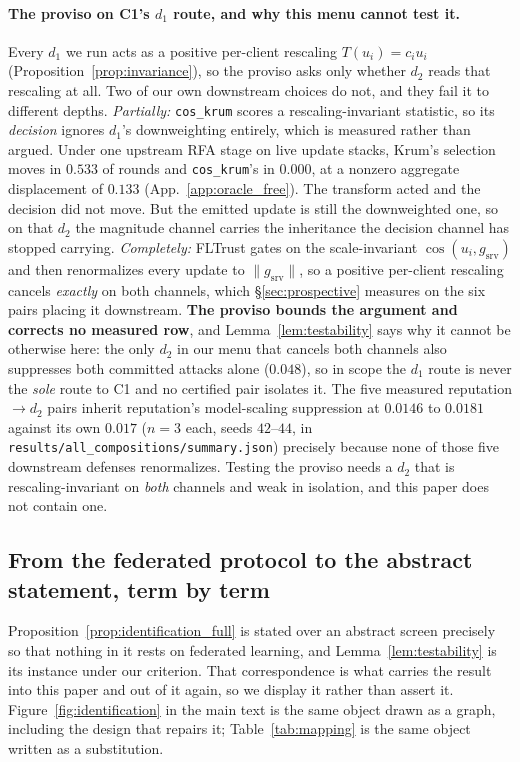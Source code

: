 \documentclass{article}
\begin{document}
\paragraph{The proviso on C1's $d_1$ route, and why this menu cannot test it.} Every $d_1$ we run acts as a positive per-client rescaling $T(u_i) = c_i u_i$ (Proposition~\ref{prop:invariance}), so the proviso asks only whether $d_2$ reads that rescaling at all. Two of our own downstream choices do not, and they fail it to different depths. \emph{Partially:} \texttt{cos\_krum} scores a rescaling-invariant statistic, so its \emph{decision} ignores $d_1$'s downweighting entirely, which is measured rather than argued. Under one upstream RFA stage on live update stacks, Krum's selection moves in $0.533$ of rounds and \texttt{cos\_krum}'s in $\mathbf{0.000}$, at a nonzero aggregate displacement of $0.133$ (App.~\ref{app:oracle_free}). The transform acted and the decision did not move. But the emitted update is still the downweighted one, so on that $d_2$ the magnitude channel carries the inheritance the decision channel has stopped carrying. \emph{Completely:} FLTrust gates on the scale-invariant $\cos(u_i, g_{\mathrm{srv}})$ and then renormalizes every update to $\|g_{\mathrm{srv}}\|$, so a positive per-client rescaling cancels \emph{exactly} on both channels, which §\ref{sec:prospective} measures on the six pairs placing it downstream. \textbf{The proviso bounds the argument and corrects no measured row}, and Lemma~\ref{lem:testability} says why it cannot be otherwise here: the only $d_2$ in our menu that cancels both channels also suppresses both committed attacks alone ($0.048$), so in scope the $d_1$ route is never the \emph{sole} route to C1 and no certified pair isolates it. The five measured reputation$\to d_2$ pairs inherit reputation's model-scaling suppression at $0.0146$ to $0.0181$ against its own $0.017$ ($n{=}3$ each, seeds $42$--$44$, in \texttt{results/\allowbreak all\_\allowbreak compositions/\allowbreak summary.json}) precisely because none of those five downstream defenses renormalizes. Testing the proviso needs a $d_2$ that is rescaling-invariant on \emph{both} channels and weak in isolation, and this paper does not contain one.

\subsection{From the federated protocol to the abstract statement, term by term}
\label{app:mapping}

Proposition~\ref{prop:identification_full} is stated over an abstract screen precisely so that nothing in it rests on federated learning, and Lemma~\ref{lem:testability} is its instance under our criterion. That correspondence is what carries the result into this paper and out of it again, so we display it rather than assert it. Figure~\ref{fig:identification} in the main text is the same object drawn as a graph, including the design that repairs it; Table~\ref{tab:mapping} is the same object written as a substitution.
\end{document}
